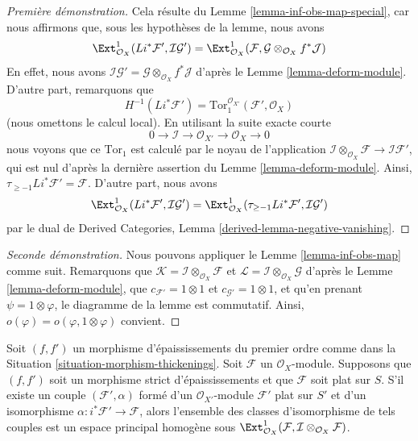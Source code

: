 \begin{proof}[Première démonstration]
Cela résulte du Lemme \ref{lemma-inf-obs-map-special},
car nous affirmons que, sous les hypothèses de la lemme, nous avons
$$
\Ext^1_{\mathcal{O}_X}(Li^*\mathcal{F}',
\mathcal{I}\mathcal{G}') =
\Ext^1_{\mathcal{O}_X}(\mathcal{F},
\mathcal{G} \otimes_{\mathcal{O}_X} f^*\mathcal{J})
$$
En effet, nous avons
$\mathcal{I}\mathcal{G}' =
\mathcal{G} \otimes_{\mathcal{O}_X} f^*\mathcal{J}$
d'après le Lemme \ref{lemma-deform-module}.
D'autre part, remarquons que
$$
H^{-1}(Li^*\mathcal{F}') =
\text{Tor}_1^{\mathcal{O}_{X'}}(\mathcal{F}', \mathcal{O}_X)
$$
(nous omettons le calcul local). En utilisant la suite exacte courte
$$
0 \to \mathcal{I} \to \mathcal{O}_{X'} \to \mathcal{O}_X \to 0
$$
nous voyons que ce $\text{Tor}_1$ est calculé par le noyau de l'application
$\mathcal{I} \otimes_{\mathcal{O}_X} \mathcal{F} \to \mathcal{I}\mathcal{F}'$,
qui est nul d'après la dernière assertion du Lemme \ref{lemma-deform-module}.
Ainsi, $\tau_{\geq -1}Li^*\mathcal{F}' = \mathcal{F}$.
D'autre part, nous avons
$$
\Ext^1_{\mathcal{O}_X}(Li^*\mathcal{F}',
\mathcal{I}\mathcal{G}') =
\Ext^1_{\mathcal{O}_X}(\tau_{\geq -1}Li^*\mathcal{F}',
\mathcal{I}\mathcal{G}')
$$
par le dual de
Derived Categories, Lemma \ref{derived-lemma-negative-vanishing}.
\end{proof}

\begin{proof}[Seconde démonstration]
Nous pouvons appliquer le Lemme \ref{lemma-inf-obs-map} comme suit. Remarquons que
$\mathcal{K} = \mathcal{I} \otimes_{\mathcal{O}_X} \mathcal{F}$ et
$\mathcal{L} = \mathcal{I} \otimes_{\mathcal{O}_X} \mathcal{G}$
d'après le Lemme \ref{lemma-deform-module}, que
$c_{\mathcal{F}'} = 1 \otimes 1$ et $c_{\mathcal{G}'} = 1 \otimes 1$,
et qu'en prenant $\psi = 1 \otimes \varphi$, le diagramme de la lemme
est commutatif. Ainsi, $o(\varphi) = o(\varphi, 1 \otimes \varphi)$
convient.
\end{proof}

\begin{lemma}
\label{lemma-inf-ext-rel}
Soit $(f, f')$ un morphisme d'épaississements du premier ordre comme dans la
Situation \ref{situation-morphism-thickenings}.
Soit $\mathcal{F}$ un $\mathcal{O}_X$-module.
Supposons que $(f, f')$ soit un morphisme strict d'épaississements et que
$\mathcal{F}$ soit plat sur $S$. S'il existe un couple
$(\mathcal{F}', \alpha)$ formé d'un
$\mathcal{O}_{X'}$-module $\mathcal{F}'$ plat sur $S'$ et d'un isomorphisme
$\alpha : i^*\mathcal{F}' \to \mathcal{F}$, alors l'ensemble des
classes d'isomorphisme de tels couples est un espace principal homogène
sous
$\Ext^1_{\mathcal{O}_X}(
\mathcal{F}, \mathcal{I} \otimes_{\mathcal{O}_X} \mathcal{F})$.
\end{lemma}

